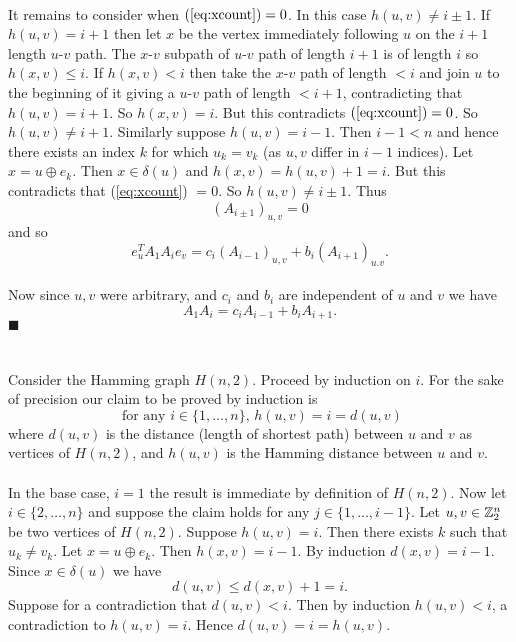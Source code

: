 \documentclass[letterpaper,12pt,oneside,onecolumn]{article}
\newcommand{\1}{\mathbbm{1}}
\begin{document}
\paragraph{}
It remains to consider when $(\ref{eq:xcount}) = 0$. In this case $h(u,v) \neq i \pm 1$. If $h(u,v) = i + 1$ then let $x$ be the vertex immediately following $u$ on the $i+1$ length $u$-$v$ path. The $x$-$v$ subpath of $u$-$v$ path of length $i+1$ is of length $i$ so $h(x, v) \leq i$. If $h(x,v) < i$ then take the $x$-$v$ path of length $<i$ and join $u$ to the beginning of it giving a $u$-$v$ path of length $< i+1$, contradicting that $h(u,v) = i+1$. So $h(x,v) = i$. But this contradicts $(\ref{eq:xcount}) = 0$. So $h(u,v) \neq i+1$. Similarly suppose $h(u,v) = i-1$. Then $i-1<n$ and hence there exists an index $k$ for which $u_k = v_k$ (as $u,v$ differ in $i-1$ indices). Let $x = u \oplus e_k$. Then $x \in \delta(u)$ and $h(x,v) = h(u,v) + 1 = i.$ But this contradicts that (\ref{eq:xcount}) $=0$. So $h(u,v) \neq i \pm 1$. Thus $$(A_{i\pm1})_{u,v} = 0$$ and so
$$e_u^T A_1 A_i e_v = c_i (A_{i-1})_{u,v} + b_i(A_{i+1})_{u.v}.$$
\paragraph{}
Now since $u,v$ were arbitrary, and $c_i$ and $b_i$ are independent of $u$ and $v$ we have
$$A_1 A_i = c_i A_{i-1} + b_i A_{i+1}.$$ $\blacksquare$

\section{}
\paragraph{}
Consider the Hamming graph $H(n,2)$. Proceed by induction on $i$. For the sake of precision our claim to be proved by induction is
$$\text{ for any $i \in \{1, \dots, n\}$, $h(u,v) = i=d(u,v)$}$$
where $d(u,v)$ is the distance (length of shortest path) between $u$ and $v$ as vertices of $H(n,2)$, and $h(u,v)$ is the Hamming distance between $u$ and $v$.
\paragraph{}
In the base case, $i=1$ the result is immediate by definition of $H(n,2)$. Now let $i \in \{2,\dots, n\}$ and suppose the claim holds for any $j \in \{1, \dots, i-1\}$. Let $u,v \in \mathbb{Z}^n_2$ be two vertices of $H(n,2)$. Suppose $h(u,v) = i$. Then there exists $k$ such that $u_k \neq v_k$. Let $x = u \oplus e_k$. Then $h(x,v) = i-1$. By induction $d(x,v) = i-1$. Since $x \in \delta(u)$ we have $$d(u,v) \leq d(x,v) +1 = i.$$
Suppose for a contradiction that $d(u,v) < i$. Then by induction $h(u,v) < i$, a contradiction to $h(u,v) = i$. Hence $d(u,v) = i = h(u,v)$.
\end{document}
